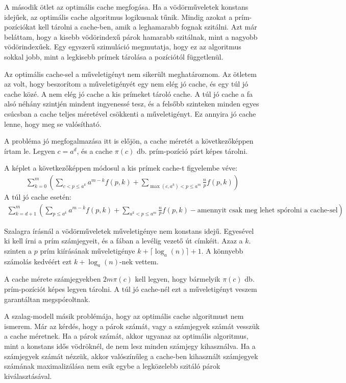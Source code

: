 \documentclass{article}
\begin{document}
A második ötlet az optimális cache megfogása.
Ha a vödörműveletek konstans idejűek, az optimális cache algoritmus logikusnak tűnik. Mindig azokat a prím-pozíciókat kell tárolni a cache-ben, amik a leghamarabb fognak szitálni.
Azt már beláttam, hogy a kisebb vödörindexű párok hamarabb szitálnak, mint a nagyobb vödörindexűek. Egy egyszerű szimuláció megmutatja, hogy ez az algoritmus sokkal jobb, mint a legkisebb prímek tárolása a pozíciótól függetlenül.

Az optimális cache-sel a műveletigényt nem sikerült meghatároznom. Az ötletem az volt, hogy beszorítom a műveletigényét egy nem elég jó cache, és egy túl jó cache közé.
A nem elég jó cache a kis prímeket tároló cache.
A túl jó cache a fa alsó néhány szintjén mindent ingyenessé tesz, és a felsőbb szinteken minden egyes csúcsban a cache teljes méretével csökkenti a műveletigényt.
Ez annyira jó cache lenne, hogy meg se valósítható.

A probléma jó megfogalmazása itt is előjön, a cache méretét a következőképpen írtam le. Legyen  $c=a^d$, és a cache $\pi(c)$ db. prím-pozíció párt képes tárolni.

A képlet a következőképpen módosul a kis prímek cache-t figyelembe véve:
\begin{align*}
\sum_{k=0}^{m} \left( \sum_{ c < p \le a^k} a^{m-k} f(p, k) + \sum_{\max(c, a^k) < p \le a^m} \frac{n}{p} f(p, k) \right)
\end{align*}
A túl jó cache esetén:
\begin{align*}
\sum_{k=d+1}^{m} \left( \sum_{ p \le a^k} a^{m-k} f(p, k) + \sum_{a^k < p \le a^m} \frac{n}{p} f(p, k) - \text{amennyit csak meg lehet spórolni a cache-sel} \right)
\end{align*}

Szalagra írásnál a vödörműveletek műveletigénye nem konstans idejű.
Egyesével ki kell írni a prím számjegyeit, és a fában a levélig vezető út címkéit.
Azaz a $k$. szinten a $p$ prím kiírásának műveletigénye $k+\lceil\log_{a}(n)\rceil+1$.
A könnyebb számolás kedvéért ezt $k+\log_{a}(n)$-nek vettem.

A cache mérete számjegyekben $2m\pi(c)$ kell legyen, hogy bármelyik $\pi(c)$ db. prím-pozíciót képes legyen tárolni. A túl jó cache-nél ezt a műveletigényt veszem garantáltan megspóroltnak.

A szalag-modell másik problémája, hogy az optimális cache algoritmust nem ismerem.
Már az kérdés, hogy a párok számát, vagy a számjegyek számát vesszük a cache méretnek.
Ha a párok számát, akkor ugyanaz az optimális algoritmus, mint a konstans idős vödröknél, de nem lesz minden számjegy kihasználva.
Ha a számjegyek számát nézzük, akkor valószínűleg a cache-ben kihasznált számjegyek számának maximalizálása nem esik egybe a legközelebb szitáló párok kiválasztásával.
\end{document}
